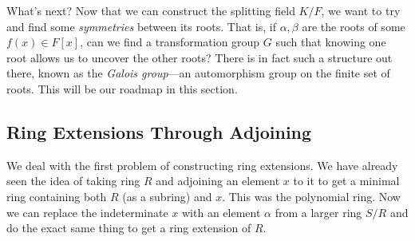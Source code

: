   What's next? Now that we can construct the splitting field $K/F$, we want to try and find some \textit{symmetries} between its roots. That is, if $\alpha, \beta$ are the roots of some $f(x) \in F[x]$, can we find a transformation group $G$ such that knowing one root allows us to uncover the other roots? There is in fact such a structure out there, known as the \textit{Galois group}---an automorphism group on the finite set of roots. This will be our roadmap in this section. 

\subsection{Ring Extensions Through Adjoining} 

  We deal with the first problem of constructing ring extensions. We have already seen the idea of taking ring $R$ and adjoining an element $x$ to it to get a minimal ring containing both $R$ (as a subring) and $x$. This was the polynomial ring. Now we can replace the indeterminate $x$ with an element $\alpha$ from a larger ring $S/R$ and do the exact same thing to get a ring extension of $R$. 

